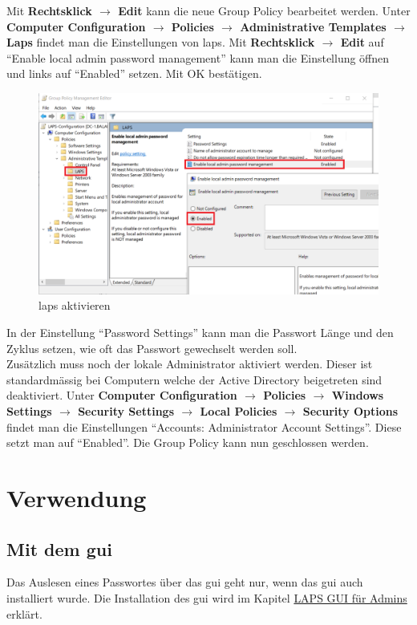 Mit \textbf{Rechtsklick $\rightarrow$ Edit} kann die neue Group Policy bearbeitet werden.
Unter \textbf{Computer Configuration $\rightarrow$ Policies $\rightarrow$ Administrative Templates $\rightarrow$ Laps} findet man die Einstellungen von \acrshort{laps}.
Mit \textbf{Rechtsklick $\rightarrow$ Edit} auf ``Enable local admin password management'' kann man die Einstellung öffnen und links auf ``Enabled'' setzen.
Mit OK bestätigen.
\begin{figure}[H]
    \centering
    \includegraphics[width=\linewidth]{../img/LAPS/enable-laps.png}
    \caption{\acrshort{laps} aktivieren}
\end{figure}

In der Einstellung ``Password Settings'' kann man die Passwort Länge und den Zyklus setzen, wie oft das Passwort gewechselt werden soll.\\

Zusätzlich muss noch der lokale Administrator aktiviert werden.
Dieser ist standardmässig bei Computern welche der Active Directory beigetreten sind deaktiviert.
Unter \textbf{Computer Configuration $\rightarrow$ Policies $\rightarrow$ Windows Settings $\rightarrow$ Security Settings $\rightarrow$ Local Policies $\rightarrow$ Security Options } findet man die Einstellungen ``Accounts: Administrator Account Settings''.
Diese setzt man auf ``Enabled''.
Die Group Policy kann nun geschlossen werden.


\section{Verwendung}
\subsection{Mit dem \acrshort{gui}}\label{subsec:laps-gui-usage}
Das Auslesen eines Passwortes über das \acrshort{gui} geht nur, wenn das \acrshort{gui} auch installiert wurde.
Die Installation des \acrshort{gui} wird im Kapitel \hyperref[subsubsec:Laps-Gui]{LAPS GUI für Admins} erklärt.\\

